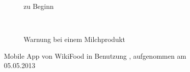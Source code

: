 \begin{figure}[ht]
\begin{subfigure}[b]{0.45\textwidth}
		\caption{zu Beginn}
		\label{img:wikifood-1}
	\end{subfigure}
	~
	\begin{subfigure}[b]{0.45\textwidth}
		\caption{Warnung bei einem Milchprodukt}
		\label{img:wikifood-2}
	\end{subfigure}
	\caption[Mobile App von WikiFood in Benutzung]{Mobile App von WikiFood in Benutzung
	, aufgenommen am 05.05.2013}
	\label{img:wikifood}
\end{figure}

